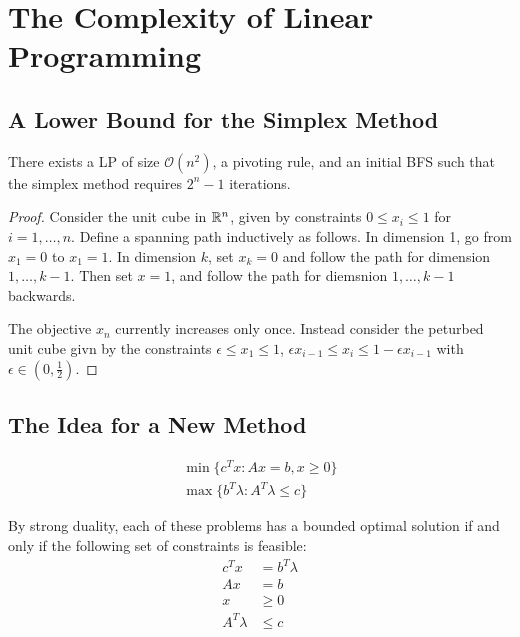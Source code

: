 
\chapter{The Complexity of Linear Programming}
\label{cha:compl-line-progr}

\section{A Lower Bound for the Simplex Method}
\label{sec:lower-bound-simplex}

\begin{thm}
  \label{defn:complexity_of_linear_programming:1}
  There exists a LP of size $\mathcal{O}(n^{2})$, a pivoting rule, and
  an initial BFS such that the simplex method requires $2^{n} - 1$ iterations.
\end{thm}

\begin{proof}
  Consider the unit cube in $\mathbb{R}^{n}$, given by constraints $0 \leq
  x_{i} \leq 1$ for $i = 1, \dots, n$.  Define a spanning path
  inductively as follows.  In dimension 1, go from $x_{1} = 0$ to
  $x_{1} = 1$.  In dimension $k$, set $x_{k} = 0$ and follow the path
  for dimension $1, \dots, k - 1$. Then set $x = 1$, and follow the
  path for diemsnion $1, \dots, k-1$ backwards.

  The objective $x_{n}$ currently increases only once.  Instead
  consider the peturbed unit cube givn by the constraints $\epsilon
  \leq x_{1} \leq 1$, $\epsilon x_{i-1} \leq x_{i} \leq 1 - \epsilon
  x_{i-1}$ with $\epsilon \in (0, \frac{1}{2})$.
\end{proof}

\section{The Idea for a New Method}
\label{sec:idea-new-method}

\begin{align}
  \label{eq:29}
  \min \{ c^{T} x : Ax = b, x \geq 0 \} \\
  \max \{ b^{T} \lambda: A^{T} \lambda \leq c \}
\end{align}

By strong duality, each of these problems has a bounded optimal
solution if and only if the following set of constraints is feasible:
\begin{align}
  \label{eq:30}
  c^{T} x      & = b^{T} \lambda \\
  Ax           & = b             \\
  x            & \geq 0          \\
  A^{T}\lambda & \leq c
\end{align}

